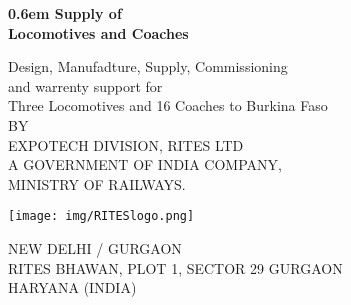 \clearpage
\newcommand\nbvspace[1][3]{\vspace*{\stretch{#1}}}
\newcommand\nbstretchyspace{\spaceskip0.5em plus 0.25em minus 0.25em}
\newcommand{\nbtitlestretch}{\spaceskip0.6em}
\pagestyle{empty}
\begin{center}
\bfseries
\nbvspace[1]
\Huge
{\nbtitlestretch\huge
Supply of \\
Locomotives and Coaches}

\nbvspace[1]
\normalsize

Design, Manufadture, Supply, Commissioning\\
and warrenty support for \\
Three Locomotives and 16 Coaches to Burkina Faso \\
\nbvspace[1]
\small BY\\
\Large EXPOTECH DIVISION, RITES  LTD\\[0.5em]
\footnotesize A GOVERNMENT OF INDIA COMPANY,\\
MINISTRY OF RAILWAYS.

\nbvspace[2]

\texttt{[image: img/RITESlogo.png]} %
\nbvspace[3]
\normalsize

NEW DELHI / GURGAON\\
\large
RITES BHAWAN, PLOT 1, SECTOR 29 GURGAON\\
HARYANA (INDIA)
\date{\today}
\nbvspace[1]
\end{center}
